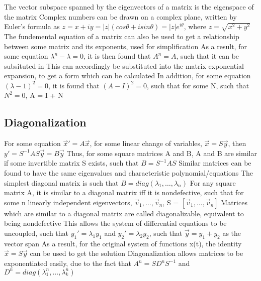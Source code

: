 \documentclass[11 pt, twoside]{article}
\newenvironment{outline*}
{
	\begin{outline}[enumerate]
	}
	{\end{outline}
}
\begin{document}
\begin{outline*}
\1 The vector subspace spanned by the eigenvectors of a matrix is the eigenspace of the matrix
\1 Complex numbers can be drawn on a complex plane, written by Euler's formula as $z = x + iy = |z|(cos\theta + isin\theta) = |z|e^{i\theta}$, where $z = \sqrt{x^2 + y^2}$
\1 The fundemental equation of a matrix can also be used to get a relationship between some matrix and its exponents, used for simplification
\2 As a result, for some equation $\lambda^n - \lambda = 0$, it is then found that $A^n = A$, such that it can be subsituted in
\3 This can accordingly be substituted into the matrix exponential expansion, to get a form which can be calculated
\2 In addition, for some equation $(\lambda - 1)^2 = 0$, it is found that $(A - I)^2 = 0$, such that for some N, such that $N^2 = 0$, A = I + N
\end{outline*}
\subsection{Diagonalization}
\begin{outline*}
\1 For some equation $\vec{x}' = A\vec{x}$, for some linear change of variables, $\vec{x} = S\vec{y}$, then $y' = S^{-1}AS\vec{y} = B\vec{y}$
\2 Thus, for some square matrices A and B, A and B are similar if  some invertible matrix S exists, such that $B = S^{-1}AS$
\2 Similar matrices can be found to have the same eigenvalues and characteristic polynomial/equations
\1 The simplest diagonal matrix is such that $B = diag(\lambda_1, \dots, \lambda_n)$
\2 For any square matrix A, it is similar to a diagonal matrix iff it is nondefective, such that for some n linearly independent eigenvectors, $\vec{v}_1, \dots, \vec{v}_n$, S = $[\vec{v}_1, \dots, \vec{v}_n]$
\2 Matrices which are similar to a diagonal matrix are called diagonalizable, equivalent to being nondefective
\2 This allows the system of differential equations to be uncoupled, such that $y_1' = \lambda_1y_1$ and $y_2' = \lambda_2 y_2$, such that $\vec{y} = y_1 + y_2$ as the vector span
\3 As a result, for the original system of functions x(t), the identity $\vec{x} = S\vec{y}$ can be used to get the solution
\2 Diagonalization allows matrices to be exponentiated easily, due to the fact that $A^n = SD^nS^{-1}$ and $D^n = diag(\lambda_1^n, \dots, \lambda_k^n)$
\end{outline*}
\end{document}
